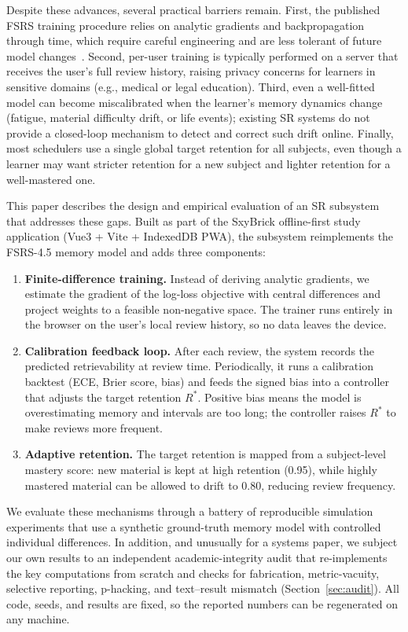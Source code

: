 \documentclass[conference]{IEEEtran}
\begin{document}
Despite these advances, several practical barriers remain. First, the published FSRS training procedure relies on analytic gradients and backpropagation through time, which require careful engineering and are less tolerant of future model changes~\cite{ye2022fsrs}. Second, per-user training is typically performed on a server that receives the user's full review history, raising privacy concerns for learners in sensitive domains (e.g., medical or legal education). Third, even a well-fitted model can become miscalibrated when the learner's memory dynamics change (fatigue, material difficulty drift, or life events); existing SR systems do not provide a closed-loop mechanism to detect and correct such drift online. Finally, most schedulers use a single global target retention for all subjects, even though a learner may want stricter retention for a new subject and lighter retention for a well-mastered one.

This paper describes the design and empirical evaluation of an SR subsystem that addresses these gaps. Built as part of the SxyBrick offline-first study application (Vue3 + Vite + IndexedDB PWA), the subsystem reimplements the FSRS-4.5 memory model and adds three components:

\begin{enumerate}
\item \textbf{Finite-difference training.} Instead of deriving analytic gradients, we estimate the gradient of the log-loss objective with central differences and project weights to a feasible non-negative space. The trainer runs entirely in the browser on the user's local review history, so no data leaves the device.
\item \textbf{Calibration feedback loop.} After each review, the system records the predicted retrievability at review time. Periodically, it runs a calibration backtest (ECE, Brier score, bias) and feeds the signed bias into a controller that adjusts the target retention $R^*$. Positive bias means the model is overestimating memory and intervals are too long; the controller raises $R^*$ to make reviews more frequent.
\item \textbf{Adaptive retention.} The target retention is mapped from a subject-level mastery score: new material is kept at high retention (0.95), while highly mastered material can be allowed to drift to 0.80, reducing review frequency.
\end{enumerate}

We evaluate these mechanisms through a battery of reproducible simulation experiments that use a synthetic ground-truth memory model with controlled individual differences. In addition, and unusually for a systems paper, we subject our own results to an independent academic-integrity audit that re-implements the key computations from scratch and checks for fabrication, metric-vacuity, selective reporting, p-hacking, and text--result mismatch (Section~\ref{sec:audit}). All code, seeds, and results are fixed, so the reported numbers can be regenerated on any machine.
\end{document}
